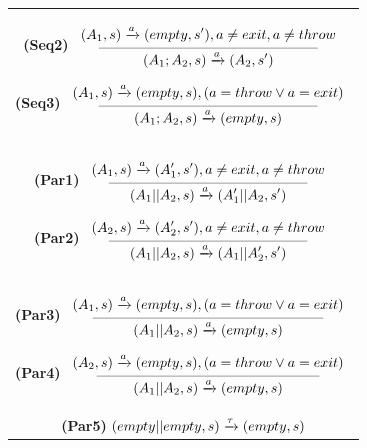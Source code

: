 \begin{table}[!h]
{{\begin{tabular}{c}
\textbf{(Seq2)}\hspace{-0.2cm}
$\reglaa{ %
(A_1,s)\xrightarrow{a}(empty,s'), a\neq exit,  a\neq throw
}
{ %
(A_1;A_2,s)
\xrightarrow{a}
(A_2,s')
}{5.5}$



\textbf{(Seq3)}\hspace{-0.2cm}
$\reglaa{ %
(A_1,s)\xrightarrow{a}(empty,s), (a=throw \vee a=exit)
}
{ %
(A_1;A_2,s)
\xrightarrow{a}
(empty,s)
}{5.5}$

\\[0.4cm]

\hspace{-0.1cm}\textbf{(Par1)}\hspace{-0.2cm}
$\reglaa{ %
(A_1,s)\xrightarrow{a}(A'_1,s'), a\neq exit, a\neq throw
}
{ %
(A_1||A_2,s)
\xrightarrow{a}
(A'_1||A_2,s')
}{5}$


\hspace{1.05cm}\textbf{(Par2)}\hspace{-0.2cm}
$\reglaa{ %
(A_2,s)\xrightarrow{a}(A'_2,s'), a\neq exit, a\neq throw
}
{ %
(A_1||A_2,s)
\xrightarrow{a}
(A_1||A'_2,s')
}{5}$


\\[0.4cm]

\hspace{0.25cm}\textbf{(Par3)}\hspace{-0.2cm}
$\reglaa{ %
(A_1,s)\xrightarrow{a}(empty,s), (a=throw \vee a=exit)
}
{ %
(A_1||A_2,s)
\xrightarrow{a}
(empty,s)
}{5.8}$



\hspace{0.0cm}\textbf{(Par4)}\hspace{-0.2cm}
$\reglaa{ %
(A_2,s)\xrightarrow{a}(empty,s), (a=throw \vee a=exit)
}
{ %
(A_1||A_2,s)
\xrightarrow{a}
(empty,s)
}{5.6}$


\\[0.4cm]
\hspace{0.2cm}\textbf{(Par5)}\hspace{-0.0cm}
${ %
(empty||empty,s)
\xrightarrow{\tau}
(empty,s)
}$



\end{tabular}}}
\end{table}
